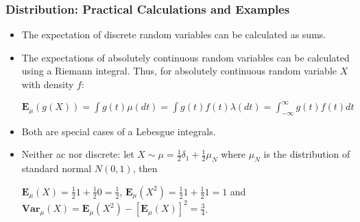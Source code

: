 \documentclass[handout]{beamer}
\newcommand{\BE}{\mathbf{E}}
\newcommand{\BV}{\mathbf{Var}}
\begin{document}
\frame
{
  \frametitle{Distribution: Practical Calculations and Examples} 

   \begin{itemize}
  
                \item<1->  The expectation of discrete random variables can be calculated as sums. 
                
                \item<2-> The expectations of absolutely continuous random variables can be calculated using a Riemann integral. Thus, for absolutely continuous random variable $X$ with density $f$:
                
                
                $\BE_{\mu}(g(X))=\int g(t) \mu(dt)=  \int g(t) f(t) \lambda(dt)= \int_{-\infty}^{\infty} g(t) f(t) dt$
                               
                \item<3-> Both are special cases of a Lebesgue integrals.
                
             \item<3->  Neither ac nor discrete: let $X \sim \mu=\frac{1}{2}\delta_1+\frac{1}{2} \mu_N$ where $\mu_N$ is the distribution of standard normal $N(0,1)$, then 
             
             $\BE_{\mu} (X)=\frac{1}{2}1+\frac{1}{2} 0=\frac{1}{2}$, $\BE_{\mu} (X^2)=\frac{1}{2}1+\frac{1}{2} 1=1$ and $\BV_{\mu}(X)=\BE_{\mu}(X^2)-[\BE_{\mu} (X) ]^2=\frac{3}{4}$.
                               
                                
\end{itemize}
}
\end{document}
